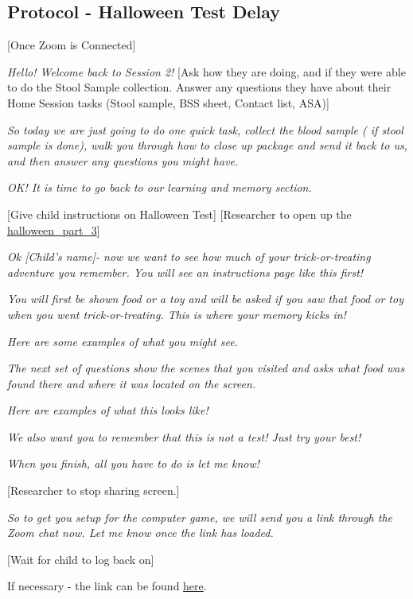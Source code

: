 \documentclass[]{book}
\begin{document}
\hypertarget{protocol---halloween-test-delay-3}{%
\subsection{Protocol - Halloween Test Delay}\label{protocol---halloween-test-delay-3}}

{[}Once Zoom is Connected{]}

\emph{Hello! Welcome back to Session 2!} {[}Ask how they are doing, and if they were able to do the Stool Sample collection. Answer any questions they have about their Home Session tasks (Stool sample, BSS sheet, Contact list, ASA){]}

\emph{So today we are just going to do one quick task, collect the blood sample ( if stool sample is done), walk you through how to close up package and send it back to us, and then answer any questions you might have.}

\emph{OK! It is time to go back to our learning and memory section.}

{[}Give child instructions on Halloween Test{]} {[}Researcher to open up the \href{https://ucla.app.box.com/file/737558206552}{halloween\_part\_3}{]}

\emph{Ok {[}Child's name{]}- now we want to see how much of your trick-or-treating adventure you remember. You will see an instructions page like this first!}

\emph{You will first be shown food or a toy and will be asked if you saw that food or toy when you went trick-or-treating. This is where your memory kicks in!}

\emph{Here are some examples of what you might see.}

\emph{The next set of questions show the scenes that you visited and asks what food was found there and where it was located on the screen.}

\emph{Here are examples of what this looks like!}

\emph{We also want you to remember that this is not a test! Just try your best!}

\emph{When you finish, all you have to do is let me know!}

{[}Researcher to stop sharing screen.{]}

\emph{So to get you setup for the computer game, we will send you a link through the Zoom chat now. Let me know once the link has loaded.}

{[}Wait for child to log back on{]}

If necessary - the link can be found \href{https://research.sc/participant/login/20451/publicid}{here}.
\end{document}
